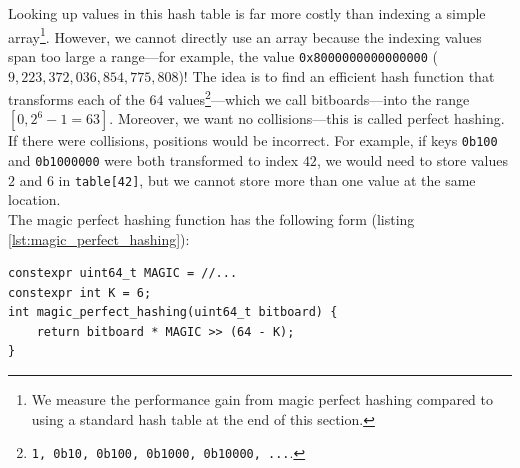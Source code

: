 \documentclass[12pt,a4paper,twoside,openright]{book}
\begin{document}
Looking up values in this hash table is far more costly than indexing a simple array\footnote{We measure the performance gain from magic perfect hashing compared to using a standard hash table at the end of this section.}. However, we cannot directly use an array because the indexing values span too large a range—for example, the value \texttt{0x8000000000000000} ($9,223,372,036,854,775,808$)! The idea is to find an efficient hash function that transforms each of the $64$ values\footnote{\texttt{1, 0b10, 0b100, 0b1000, 0b10000, ...}.}—which we call bitboards—into the range $[0, 2^6 - 1 = 63]$.
Moreover, we want no collisions—this is called perfect hashing. If there were collisions, positions would be incorrect. For example, if keys \texttt{0b100} and \texttt{0b1000000} were both transformed to index $42$, we would need to store values $2$ and $6$ in \texttt{table[42]}, but we cannot store more than one value at the same location.\\
The magic perfect hashing function has the following form (listing \ref{lst:magic_perfect_hashing}):

\begin{mdframed}[skipabove=\baselineskip,hidealllines=true]
\begin{verbatim}
constexpr uint64_t MAGIC = //...
constexpr int K = 6;
int magic_perfect_hashing(uint64_t bitboard) {
    return bitboard * MAGIC >> (64 - K);
}
\end{verbatim}
\vspace{-0.5em}
\label{lst:magic_perfect_hashing}
\end{mdframed}
\end{document}
